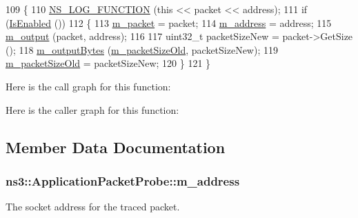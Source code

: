 \begin{DoxyCode}
109 \{
110   \hyperlink{log-macros-disabled_8h_a90b90d5bad1f39cb1b64923ea94c0761}{NS\_LOG\_FUNCTION} (\textcolor{keyword}{this} << packet << address);
111   \textcolor{keywordflow}{if} (\hyperlink{classns3_1_1Probe_a201d605485aaa1c96b973656d6eb56eb}{IsEnabled} ())
112     \{
113       \hyperlink{classns3_1_1ApplicationPacketProbe_a1b1bc6d7801f9b5d0de89cc24d24edfb}{m\_packet}  = packet;
114       \hyperlink{classns3_1_1ApplicationPacketProbe_addc226991c69ccac086df131989114f5}{m\_address} = address;
115       \hyperlink{classns3_1_1ApplicationPacketProbe_a99aa065d8b1a089f6e3b5fb51cd66f9c}{m\_output} (packet, address);
116 
117       uint32\_t packetSizeNew = packet->GetSize ();
118       \hyperlink{classns3_1_1ApplicationPacketProbe_a900aa5c6f1cd3b0c0f25f534e0866853}{m\_outputBytes} (\hyperlink{classns3_1_1ApplicationPacketProbe_ad3ecd81e5fbd3b867eb1f46c5e8cfddb}{m\_packetSizeOld}, packetSizeNew);
119       \hyperlink{classns3_1_1ApplicationPacketProbe_ad3ecd81e5fbd3b867eb1f46c5e8cfddb}{m\_packetSizeOld} = packetSizeNew;
120     \}
121 \}
\end{DoxyCode}


Here is the call graph for this function\+:




Here is the caller graph for this function\+:




\subsection{Member Data Documentation}
\subsubsection[{\texorpdfstring{m\+\_\+address}{m_address}}]{ ns3\+::\+Application\+Packet\+Probe\+::m\+\_\+address\hspace{0.3cm}{\ttfamily [private]}}\hypertarget{classns3_1_1ApplicationPacketProbe_addc226991c69ccac086df131989114f5}{}\label{classns3_1_1ApplicationPacketProbe_addc226991c69ccac086df131989114f5}


The socket address for the traced packet. 

